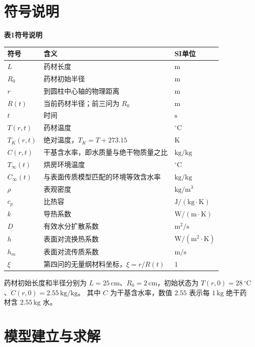 \documentclass[withoutpreface,bwprint]{cumcmthesis}
\begin{document}
\section{符号说明}
{\centering\textbf{表1\quad 符号说明}\par}
\begin{table}[H]
\centering
\renewcommand{\arraystretch}{1.12}
\begin{tabularx}{0.96\textwidth}{>{\centering\arraybackslash}p{}X>{\centering\arraybackslash}p{}}
\toprule
符号 & 含义 & SI单位 \\
\midrule
$L$ & 药材长度 & $\mathrm{m}$ \\
$R_0$ & 药材初始半径 & $\mathrm{m}$ \\
$r$ & 到圆柱中心轴的物理距离 & $\mathrm{m}$ \\
$R(t)$ & 当前药材半径；前三问为 $R_0$ & $\mathrm{m}$ \\
$t$ & 时间 & $\mathrm{s}$ \\
$T(r,t)$ & 药材温度 & $^\circ\mathrm{C}$ \\
$T_K(r,t)$ & 绝对温度，$T_K=T+273.15$ & $\mathrm{K}$ \\
$C(r,t)$ & 干基含水率，即水质量与绝干物质量之比 & $\mathrm{kg/kg}$ \\
$T_\infty(t)$ & 烘房环境温度 & $^\circ\mathrm{C}$ \\
$C_\infty(t)$ & 与表面传质模型匹配的环境等效含水率 & $\mathrm{kg/kg}$ \\
$\rho$ & 表观密度 & $\mathrm{kg/m^3}$ \\
$c_p$ & 比热容 & $\mathrm{J/(kg\cdot K)}$ \\
$k$ & 导热系数 & $\mathrm{W/(m\cdot K)}$ \\
$D$ & 有效水分扩散系数 & $\mathrm{m^2/s}$ \\
$h$ & 表面对流换热系数 & $\mathrm{W/(m^2\cdot K)}$ \\
$h_m$ & 表面对流传质系数 & $\mathrm{m/s}$ \\
$\xi$ & 第四问的无量纲材料坐标，$\xi=r/R(t)$ & $1$ \\
\bottomrule
\end{tabularx}
\end{table}

药材初始长度和半径分别为 $L=25\,\mathrm{cm}$、$R_0=2\,\mathrm{cm}$，初始状态为 $T(r,0)=28\,{}^\circ\mathrm{C}$、$C(r,0)=2.55\,\mathrm{kg/kg}$。
其中 $C$ 为干基含水率，数值 $2.55$ 表示每 $1\,\mathrm{kg}$ 绝干药材含 $2.55\,\mathrm{kg}$ 水。


\section{模型建立与求解}
\end{document}
